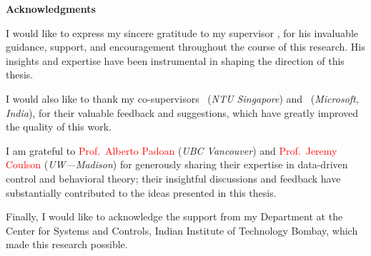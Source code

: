 
\centerline{\large\bfseries \sffamily Acknowledgments}

\vspace{1em}

I would like to express my sincere gratitude to my supervisor \Supervisor , for his invaluable guidance, support, and encouragement throughout the course of this research. His insights and expertise have been instrumental in shaping the direction of this thesis.

I would also like to thank my co-supervisors \CoSupervisor \ (\emph{NTU Singapore}) and \CoSupervisorAlt \ (\emph{Microsoft, India}), for their valuable feedback and suggestions, which have greatly improved the quality of this work.

I am grateful to \textcolor{red}{Prof.~Alberto Padoan} (\emph{UBC Vancouver}) and \textcolor{red}{Prof.~Jeremy Coulson} (\emph{UW---Madison}) for generously sharing their expertise in data-driven control and behavioral theory; their insightful discussions and feedback have substantially contributed to the ideas presented in this thesis.

Finally, I would like to acknowledge the support from my Department at the Center for Systems and Controls, Indian Institute of Technology Bombay, which made this research possible.
